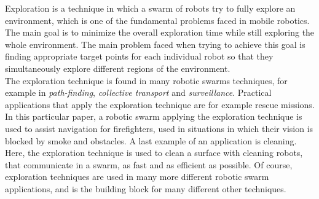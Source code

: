 Exploration is a technique in which a swarm of robots try to fully explore an environment, which is one of the fundamental problems faced in mobile robotics. 
The main goal is to minimize the overall exploration time while still exploring the whole environment. 
The main problem faced when trying to achieve this goal is finding appropriate target points for each individual robot so that they simultaneously explore different regions of the environment. \cite{burgard2005coordinated} \\
The exploration technique is found in many robotic swarms techniques, for example in \emph{path-finding}, \emph{collective transport} and \emph{surveillance}.
Practical applications that apply the exploration technique are for example rescue missions. \cite{Naghsh2008,Penders2011}
In this particular paper, a robotic swarm applying the exploration technique is used to assist navigation for firefighters, used in situations in which their vision is blocked by smoke and obstacles. 
A last example of an application is cleaning. \cite{wagner2008cooperative}
Here, the exploration technique is used to clean a surface with cleaning robots, that communicate in a swarm, as fast and as efficient as possible. 
Of course, exploration techniques are used in many more different robotic swarm applications, and is the building block for many different other techniques. 

